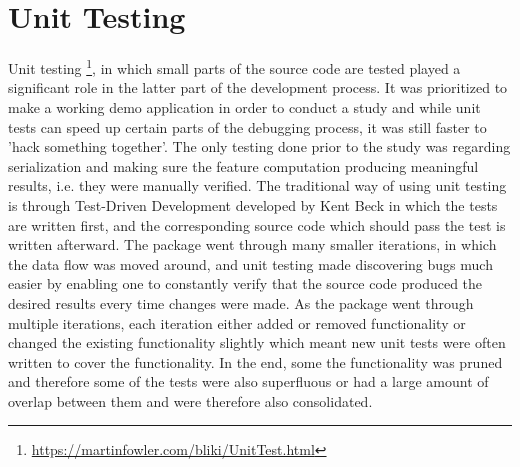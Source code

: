 \chapter{Unit Testing}
\label{appendix:unit-testing}
Unit testing \footnote{\url{https://martinfowler.com/bliki/UnitTest.html}}, in which small parts of the source code are tested played a significant role in the latter part of the development process. It was prioritized to make a working demo application in order to conduct a study and while unit tests can speed up certain parts of the debugging process, it was still faster to 'hack something together'. The only testing done prior to the study was regarding serialization and making sure the feature computation producing meaningful results, i.e. they were manually verified. The traditional way of using unit testing is through Test-Driven Development developed by Kent Beck \cite{beck-tdd} in which the tests are written first, and the corresponding source code which should pass the test is written afterward. The package went through many smaller iterations, in which the data flow was moved around, and unit testing made discovering bugs much easier by enabling one to constantly verify that the source code produced the desired results every time changes were made. As the package went through multiple iterations, each iteration either added or removed functionality or changed the existing functionality slightly which meant new unit tests were often written to cover the functionality. In the end, some the functionality was pruned and therefore some of the tests were also superfluous or had a large amount of overlap between them and were therefore also consolidated. 

